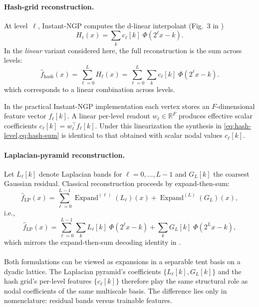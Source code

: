 \documentclass[a4paper,11pt,oneside]{article}
\numberwithin{equation}{section}
\begin{document}
\paragraph{Hash-grid reconstruction.}
At level~\(\ell\), Instant-NGP computes the d-linear interpolant (Fig.~3 in \cite{mueller2022instant})
\begin{equation}
\label{eq:hash-level}
H_\ell(x)=\sum_k c_\ell[k]\;\Phi(2^\ell x-k).
\end{equation}
In the \emph{linear} variant considered here, the full reconstruction is the sum across levels:
\begin{equation}
\label{eq:hash-sum}
\widehat f_{\mathrm{hash}}(x)
=\sum_{\ell=0}^{L} H_\ell(x)
=\sum_{\ell=0}^{L}\sum_k c_\ell[k]\;\Phi(2^\ell x-k).
\end{equation}
which corresponds to a linear combination across levels.

In the practical Instant-NGP implementation each vertex stores an
$F$-dimensional feature vector $f_\ell[k]$.  A linear per-level readout
$w_\ell\in\mathbb{R}^F$ produces effective scalar coefficients
$c_\ell[k]=w_\ell^\top f_\ell[k]$.
Under this linearization the synthesis in
\cref{eq:hash-level,eq:hash-sum} is identical to that obtained with
scalar nodal values $c_\ell[k]$.


\paragraph{Laplacian-pyramid reconstruction.}
Let \(L_\ell[k]\) denote Laplacian bands for \(\ell=0,\dots,L-1\) and \(G_L[k]\) the coarsest Gaussian residual. Classical reconstruction proceeds by expand-then-sum:
\begin{equation}
\label{eq:lp-recon}
\widehat f_{\mathrm{LP}}(x)
=\sum_{\ell=0}^{L-1}\operatorname{Expand}^{(\ell)}(L_\ell)(x)
+\operatorname{Expand}^{(L)}(G_L)(x),
\end{equation}
i.e.,
\begin{equation}
\label{eq:lp-recon-sum}
\widehat f_{\mathrm{LP}}(x)
=\sum_{\ell=0}^{L-1}\sum_k L_\ell[k]\;\Phi(2^\ell x-k)
+\sum_k G_L[k]\;\Phi(2^L x-k),
\end{equation}
which mirrors the expand-then-sum decoding identity in \cite{burt1983laplacian}.
\paragraph{}
Both formulations can be viewed as expansions in a separable tent basis on a dyadic lattice. The Laplacian pyramid’s coefficients \(\{L_\ell[k], G_L[k]\}\) and the hash grid’s per-level features \(\{c_\ell[k]\}\) therefore play the same structural role as nodal coefficients of the same multiscale basis. The difference lies only in nomenclature: residual bands versus trainable features.
\end{document}
